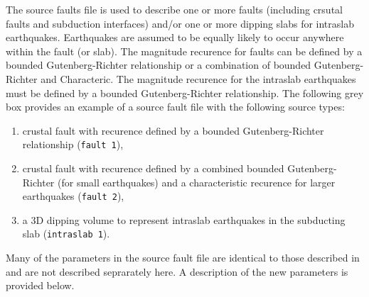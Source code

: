 The source faults file is used to describe one or more faults
(including crsutal faults and subduction interfaces) and/or one or
more dipping slabs for intraslab earthquakes. Earthquakes are
assumed to be equally likely to occur anywhere within the fault (or
slab). The magnitude recurence for faults can be defined by a
bounded Gutenberg-Richter relationship or a combination of bounded
Gutenberg-Richter and Characteric. The magnitude recurence for the
intraslab earthquakes must be defined by a bounded Gutenberg-Richter
relationship. The following grey box provides an example of a source
fault file with the following source types:
\begin{enumerate}
\item crustal fault with recurence defined by a bounded Gutenberg-Richter
relationship (\texttt{fault 1}), \\
\item crustal fault with recurence defined by a combined bounded Gutenberg-Richter
(for small earthquakes) and a characteristic recurence for larger
earthquakes (\texttt{fault 2}), \\
\item a 3D dipping volume to represent intraslab earthquakes in the
subducting slab (\texttt{intraslab 1}).
\end{enumerate}
Many of the parameters in the source fault file are identical to
those described in  and are not described
seprarately here. A description of the new parameters is provided
below. 

